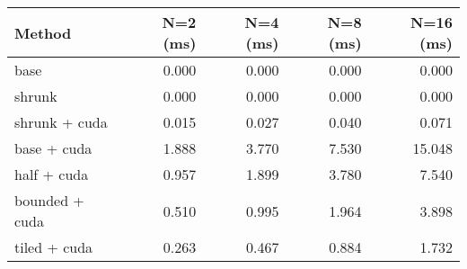 \begin{tabular}{lrrrr}
\hline
 Method         &   N=2 (ms) &   N=4 (ms) &   N=8 (ms) &   N=16 (ms) \\
\hline
 base           &      0.000 &      0.000 &      0.000 &       0.000 \\
 shrunk         &      0.000 &      0.000 &      0.000 &       0.000 \\
 shrunk + cuda  &      0.015 &      0.027 &      0.040 &       0.071 \\
 base + cuda    &      1.888 &      3.770 &      7.530 &      15.048 \\
 half + cuda    &      0.957 &      1.899 &      3.780 &       7.540 \\
 bounded + cuda &      0.510 &      0.995 &      1.964 &       3.898 \\
 tiled + cuda   &      0.263 &      0.467 &      0.884 &       1.732 \\
\hline
\end{tabular}
